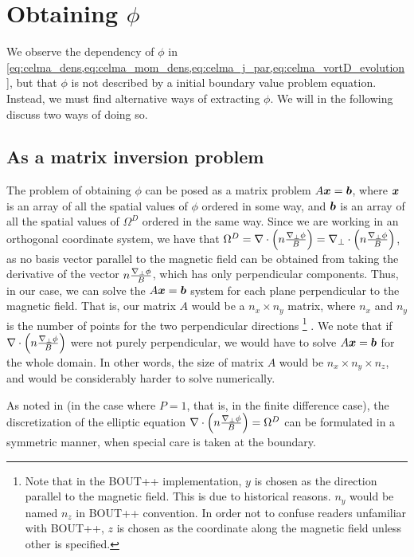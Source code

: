 \section{Obtaining \texorpdfstring{$\phi$}{the potential}}
%
We observe the dependency of $\phi$ in \cref{eq:celma_dens,eq:celma_mom_dens,eq:celma_j_par,eq:celma_vortD_evolution}, but that $\phi$ is not described by a initial boundary value problem equation.
Instead, we must find alternative ways of extracting $\phi$.
We will in the following discuss two ways of doing so.

\subsection{As a matrix inversion problem}
%
The problem of obtaining $\phi$ can be posed as a matrix problem $A\boldsymbol{x}=\boldsymbol{b}$, where $\boldsymbol{x}$ is an array of all the spatial values of $\phi$ ordered in some way, and $\boldsymbol{b}$ is an array of all the spatial values of $\Omega^D$ ordered in the same way.
Since we are working in an orthogonal coordinate system, we have that $\Omega^D = \nabla\cdot\left(n\frac{\nabla_\perp\phi}{B}\right) = \nabla_\perp\cdot\left(n\frac{\nabla_\perp\phi}{B}\right)$, as no basis vector parallel to the magnetic field can be obtained from taking the derivative of the vector $n\frac{\nabla_\perp\phi}{B}$, which has only perpendicular components.
Thus, in our case, we can solve the $A\boldsymbol{x}=\boldsymbol{b}$ system for each plane perpendicular to the magnetic field.
That is, our matrix $A$ would be a $n_x \times n_y$ matrix, where $n_x$ and $n_y$ is the number of points for the two perpendicular directions
%
\footnote{
Note that in the BOUT++ implementation, $y$ is chosen as the direction parallel to the magnetic field.
This is due to historical reasons.
$n_y$ would be named $n_z$ in BOUT++ convention.
In order not to confuse readers unfamiliar with BOUT++, $z$ is chosen as the coordinate along the magnetic field unless other is specified.
}%
%
.
We note that if $\nabla\cdot\left(n\frac{\nabla_\perp\phi}{B}\right)$ were not purely perpendicular, we would have to solve $A\boldsymbol{x}=\boldsymbol{b}$ for the whole domain.
In other words, the size of matrix $A$ would be $n_x \times n_y \times n_z$, and would be considerably harder to solve numerically.

As noted in \cite{Wiesenberger2014Phd} (in the case where $P=1$, that is, in the finite difference case), the discretization of the elliptic equation $\nabla\cdot\left(n\frac{\nabla_\perp\phi}{B}\right)=\Omega^D$ can be formulated in a symmetric manner, when special care is taken at the boundary.

